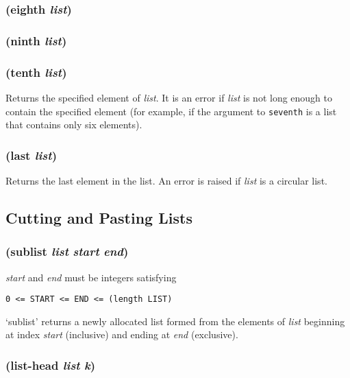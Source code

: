 \documentclass{article}
\begin{document}
\subsubsection{(eighth \emph{list})}

\subsubsection{(ninth \emph{list})}

\subsubsection{(tenth \emph{list})}

Returns the specified element of \emph{list}. It is an error if \emph{list} is not long enough
to contain the specified element (for example, if the argument to \verb|seventh| is a list
that contains only six elements).

\subsubsection{(last \emph{list})}

Returns the last element in the list. An error is raised if \emph{list} is a circular list.

\subsection{Cutting and Pasting Lists}\label{sec:cutting-and-pasting-lists}

\subsubsection{(sublist \emph{list} \emph{start} \emph{end})}

\emph{start} and \emph{end} must be integers satisfying

\begin{verbatim}
0 <= START <= END <= (length LIST)
\end{verbatim}

`sublist' returns a newly allocated list formed from the elements of \emph{list}
beginning at index \emph{start} (inclusive) and ending at \emph{end} (exclusive).

\subsubsection{(list-head \emph{list} \emph{k})}
\end{document}

